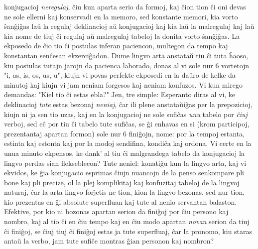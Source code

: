 konjugacioj {\sl neregulaj}, \^ciu kun aparta serio da formoj, kaj
\^cion tion \^ci oni devas ne sole ellerni kaj konservadi en la
memoro, sed konstante memori, kia vorto \^san\^gi\^gas la\u u la
regulaj deklinacioj a\u u konjugacioj kaj kia la\u u la malregulaj
kaj la\u u kia nome de tiuj \^ci regulaj a\u u malregulaj tabeloj la
donita vorto \^san\^gi\^gas. La ekposedo de \^cio tio \^ci postulas
inferan paciencon, multegon da tempo kaj konstantan sen\^cesan
ekzerci\^gadon. Dume lingvo arta anstata\u u tiu \^ci tuta \^haoso,
kiu postulas tutajn jarojn da pacienca laborado, donas al vi sole
nur 6 vortetojn "i, as, is, os, us, u", kiujn vi povas perfekte
ekposedi en la da\u uro de kelke da minutoj kaj kiujn vi jam neniam
forgesos kaj neniam konfuzos. Vi kun mirego demandas: "Kiel tio
\^ci estas ebla?" Jen, tre simple: Esperanto diras al vi, ke
deklinacioj {\sl tute} estas bezonaj {\sl neniaj}, \^car ili plene
anstata\u ui\^gas per la prepozicioj, kiujn ni ja sen tio uzas, kaj
en la konjugacioj ne sole sufi\^cas {\sl unu} tabelo por {\sl
\^ciuj} verboj, sed e\^c por tiu \^ci tabelo tute sufi\^cas, se \^gi
enhavas en si (krom participoj, prezentantaj apartan formon) sole
nur 6 fini\^gojn, nome: por la tempoj estanta, estinta kaj estonta
kaj por la modoj sendifina, kondi\^ca kaj ordona. Vi certe en la
unua minuto ekpensos, ke dank' al tiu \^ci malgrandega tabelo da
konjugacioj la lingvo perdas sian flekseblecon? Tute neniel:
konati\^gu kun la lingvo arta, kaj vi ekvidos, ke \^gia konjugacio
esprimas \^ciujn nuancojn de la penso senkompare pli bone kaj pli
precize, ol la plej komplikitaj kaj konfuzitaj tabeloj de la lingvoj
naturaj, \^car la arta lingvo for\^{\j}etis ne tion, kion la lingvo
bezonas, sed nur tion, kio prezentas en \^gi absolute superfluan kaj
tute al nenio servantan balaston. Efektive, por kio ni bozonas
apartan serion da fini\^goj por \^ciu persono kaj nombro, kaj al tio
\^ci en \^ciu tempo kaj en \^ciu modo apartan {\sl novan} serion da
tiuj \^ci fini\^goj, se \^ciuj tiuj \^ci fini\^goj estas ja tute
superfluaj, \^car la pronomo, kiu staras anta\u u la verbo, jam tute
sufi\^ce montras \^gian personon kaj nombron?

